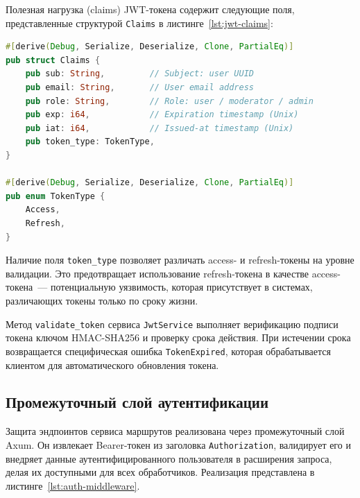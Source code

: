 Полезная нагрузка (claims) JWT-токена содержит следующие поля, представленные структурой \texttt{Claims} в листинге~\ref{lst:jwt-claims}:

\begin{lstlisting}[language=Rust, caption={Структура полезной нагрузки JWT-токена}, label={lst:jwt-claims}]
#[derive(Debug, Serialize, Deserialize, Clone, PartialEq)]
pub struct Claims {
    pub sub: String,         // Subject: user UUID
    pub email: String,       // User email address
    pub role: String,        // Role: user / moderator / admin
    pub exp: i64,            // Expiration timestamp (Unix)
    pub iat: i64,            // Issued-at timestamp (Unix)
    pub token_type: TokenType,
}

#[derive(Debug, Serialize, Deserialize, Clone, PartialEq)]
pub enum TokenType {
    Access,
    Refresh,
}
\end{lstlisting}

Наличие поля \texttt{token\_type} позволяет различать access- и refresh-токены на уровне валидации. Это предотвращает использование refresh-токена в качестве access-токена~--- потенциальную уязвимость, которая присутствует в системах, различающих токены только по сроку жизни.

Метод \texttt{validate\_token} сервиса \texttt{JwtService} выполняет верификацию подписи токена ключом HMAC-SHA256 и проверку срока действия. При истечении срока возвращается специфическая ошибка \texttt{TokenExpired}, которая обрабатывается клиентом для автоматического обновления токена.

\subsection{Промежуточный слой аутентификации}

Защита эндпоинтов сервиса маршрутов реализована через промежуточный слой Axum.
Он извлекает Bearer-токен из заголовка \texttt{Authorization}, валидирует его и
внедряет данные аутентифицированного пользователя в расширения запроса, делая их
доступными для всех обработчиков. Реализация представлена в
листинге~\ref{lst:auth-middleware}.

